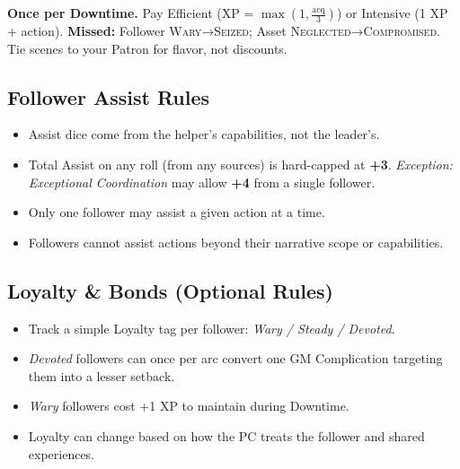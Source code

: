 \begin{tcolorbox}[title={Quick Reference},colback=gray!5,colframe=black]
\textbf{Once per Downtime.} Pay Efficient (XP = $\max(1, \tfrac{\text{acq}}{3})$) or Intensive (1 XP + action). \textbf{Missed:} Follower \to \textsc{Wary}→\textsc{Seized}; Asset \to \textsc{Neglected}→\textsc{Compromised}. Tie scenes to your Patron for flavor, not discounts.
\end{tcolorbox}

\subsection{Follower Assist Rules}
\label{subsec:follower-assist}

\begin{itemize}
    \item Assist dice come from the helper's capabilities, not the leader's. 
    \item Total Assist on any roll (from any sources) is hard-capped at \textbf{+3}. \emph{Exception:} \textit{Exceptional Coordination} may allow \textbf{+4} from a single follower. 
    \item Only one follower may assist a given action at a time. 
    \item Followers cannot assist actions beyond their narrative scope or capabilities.
\end{itemize}

\subsection{Loyalty \& Bonds (Optional Rules)}
\label{subsec:follower-loyalty}

\begin{itemize}
    \item Track a simple Loyalty tag per follower: \emph{Wary / Steady / Devoted}. 
    \item \emph{Devoted} followers can once per arc convert one GM Complication targeting them into a lesser setback. 
    \item \emph{Wary} followers cost +1 XP to maintain during Downtime. 
    \item Loyalty can change based on how the PC treats the follower and shared experiences.
\end{itemize}

